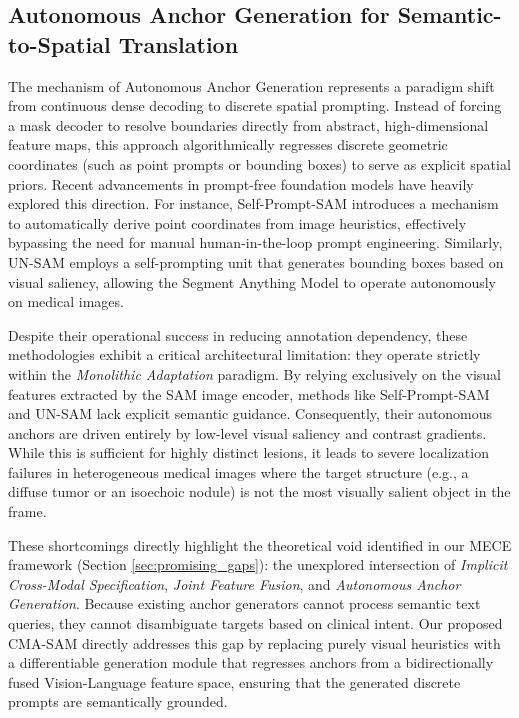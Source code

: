 \documentclass[onecolumn]{IEEEtran}
\numberwithin{equation}{section}
\theoremstyle{definition}
\theoremstyle{remark}
\begin{document}
\subsection{Autonomous Anchor Generation for Semantic-to-Spatial Translation}

The mechanism of Autonomous Anchor Generation represents a paradigm shift from continuous dense decoding to discrete spatial prompting. Instead of forcing a mask decoder to resolve boundaries directly from abstract, high-dimensional feature maps, this approach algorithmically regresses discrete geometric coordinates (such as point prompts or bounding boxes) to serve as explicit spatial priors. Recent advancements in prompt-free foundation models have heavily explored this direction. For instance, Self-Prompt-SAM \cite{xie2025self} introduces a mechanism to automatically derive point coordinates from image heuristics, effectively bypassing the need for manual human-in-the-loop prompt engineering. Similarly, UN-SAM \cite{chen2024un} employs a self-prompting unit that generates bounding boxes based on visual saliency, allowing the Segment Anything Model to operate autonomously on medical images.

Despite their operational success in reducing annotation dependency, these methodologies exhibit a critical architectural limitation: they operate strictly within the \textit{Monolithic Adaptation} paradigm. By relying exclusively on the visual features extracted by the SAM image encoder, methods like Self-Prompt-SAM \cite{xie2025self} and UN-SAM \cite{chen2024un} lack explicit semantic guidance. Consequently, their autonomous anchors are driven entirely by low-level visual saliency and contrast gradients. While this is sufficient for highly distinct lesions, it leads to severe localization failures in heterogeneous medical images where the target structure (e.g., a diffuse tumor or an isoechoic nodule) is not the most visually salient object in the frame. 

These shortcomings directly highlight the theoretical void identified in our MECE framework (Section \ref{sec:promising_gaps}): the unexplored intersection of \textit{Implicit Cross-Modal Specification}, \textit{Joint Feature Fusion}, and \textit{Autonomous Anchor Generation}. Because existing anchor generators cannot process semantic text queries, they cannot disambiguate targets based on clinical intent. Our proposed CMA-SAM directly addresses this gap by replacing purely visual heuristics with a differentiable generation module that regresses anchors from a bidirectionally fused Vision-Language feature space, ensuring that the generated discrete prompts are semantically grounded.
\end{document}
